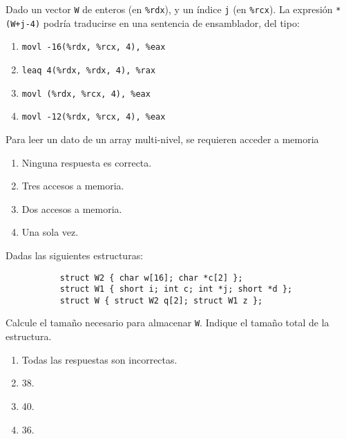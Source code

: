 \documentclass[12pt]{article}
\begin{document}
    \begin{ejercicio}
        Dado un vector \verb|W| de enteros (en \verb|%rdx|), y un índice \verb|j| (en \verb|%rcx|). La expresión \verb|*(W+j-4)| podría traducirse en una sentencia de ensamblador, del tipo:
        \begin{enumerate}[label=\alph*)]
            \item \verb|movl -16(%rdx, %rcx, 4), %eax|
            \item \verb|leaq 4(%rdx, %rdx, 4), %rax|
            \item \verb|movl (%rdx, %rcx, 4), %eax|
            \item \verb|movl -12(%rdx, %rcx, 4), %eax|
        \end{enumerate}
    \end{ejercicio}
    \begin{ejercicio}
        Para leer un dato de un array multi-nivel, se requieren acceder a memoria
        \begin{enumerate}[label=\alph*)]
            \item Ninguna respuesta es correcta.
            \item Tres accesos a memoria.
            \item Dos accesos a memoria.
            \item Una sola vez.
        \end{enumerate}
    \end{ejercicio}
    \begin{ejercicio}
        Dadas las siguientes estructuras:
        \begin{verbatim}
           struct W2 { char w[16]; char *c[2] };
           struct W1 { short i; int c; int *j; short *d };
           struct W { struct W2 q[2]; struct W1 z };
        \end{verbatim}
        Calcule el tamaño necesario para almacenar \verb|W|. Indique el tamaño total de la estructura.
        \begin{enumerate}[label=\alph*)]
            \item Todas las respuestas son incorrectas.
            \item 38.
            \item 40.
            \item 36.
        \end{enumerate}
    \end{ejercicio}
\end{document}
